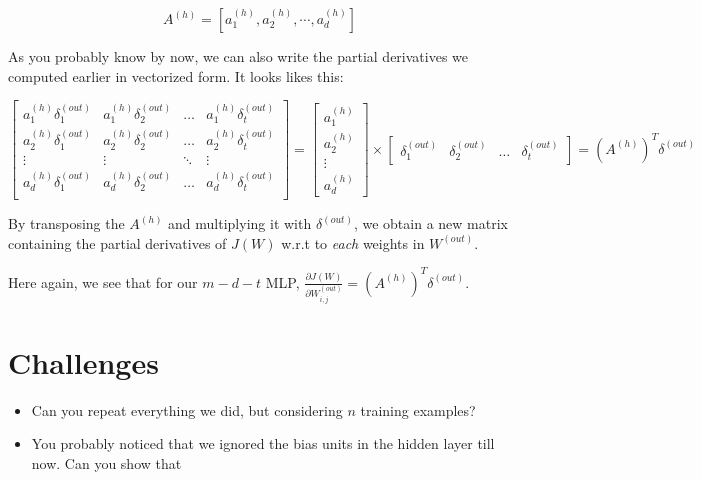 \documentclass[12pt, letterpaper]{article}
\begin{document}
\[
    A^{(h)} = [a_1^{(h)}, a_2^{(h)}, \cdots, a_d^{(h)}]
\]

As you probably know by now, we can also write the partial derivatives
we computed earlier in vectorized form. It looks likes this:

\[
    \begin{bmatrix}
        a_1^{(h)} \delta_1^{(out)} & a_1^{(h)} \delta_2^{(out)} & \dots     & a_1^{(h)} \delta_t^{(out)}\\
        a_2^{(h)} \delta_1^{(out)} & a_2^{(h)} \delta_2^{(out)} & \dots     & a_2^{(h)} \delta_t^{(out)}\\
        \vdots                     & \vdots                     & \ddots    & \vdots                    \\
        a_d^{(h)} \delta_1^{(out)} & a_d^{(h)} \delta_2^{(out)} & \dots     & a_d^{(h)} \delta_t^{(out)}\\
    \end{bmatrix}
    =
    \begin{bmatrix}
        a_1^{(h)} \\
        a_2^{(h)} \\
        \vdots \\
        a_d^{(h)}
    \end{bmatrix}
    \times
    \begin{bmatrix}
        \delta_1^{(out)} & \delta_2^{(out)} & \dots & \delta_t^{(out)}
    \end{bmatrix}
    = 
    (A^{(h)})^{T} \delta^{(out)}
\]

By transposing the $A^{(h)}$ and multiplying it with
$\delta^{(out)}$, we obtain a new matrix containing the partial
derivatives of $J(W)$ w.r.t to \emph{each} weights in $W^{(out)}$.

\vspace{5mm} %

Here again, we see that for our $m-d-t$ MLP, $\frac{\partial J(W)}
{\partial W_{i,j}^{(out)}} = (A^{(h)})^{T} \delta^{(out)}$.

\section{Challenges}

\begin{itemize}
    \item Can you repeat everything we did, but considering $n$ training
    examples?

    \item You probably noticed that we ignored the bias units in 
    the hidden layer till now. Can you show that
\end{itemize}
\end{document}
